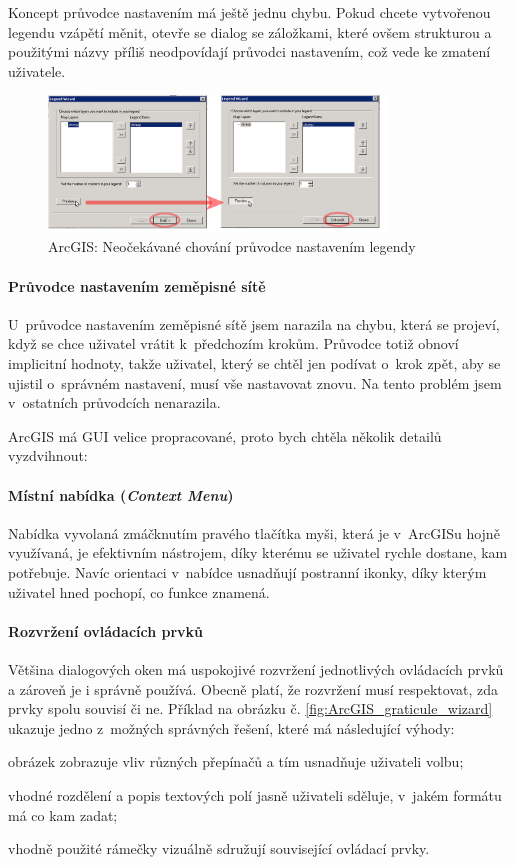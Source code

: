 \documentclass[a4paper,12pt,draft]{article}
\begin{document}
Koncept průvodce nastavením má ještě jednu chybu. Pokud chcete vytvořenou
legendu vzápětí měnit, otevře se dialog se záložkami, které ovšem
strukturou a použitými názvy příliš neodpovídají průvodci nastavením,
což vede ke zmatení uživatele.

\begin{figure}[h!]
\centering
\includegraphics[width=0.8\textwidth]{./GUI_screenshots/ArcGIS_legend_wizard.png}
\caption{ArcGIS: Neočekávané chování průvodce nastavením legendy}
\label{fig:ArcGIS_legend_wizard}
\end{figure}


\paragraph*{Průvodce nastavením zeměpisné sítě}
U~průvodce nastavením zeměpisné sítě jsem narazila na chybu, která se
projeví, když se chce uživatel vrátit k~předchozím krokům. Průvodce
totiž obnoví implicitní hodnoty, takže uživatel, který se chtěl jen
podívat o~krok zpět, aby se ujistil o~správném nastavení, musí vše
nastavovat znovu. Na tento problém jsem v~ostatních průvodcích nenarazila.

\bigskip
ArcGIS má GUI velice propracované, proto
bych chtěla několik detailů vyzdvihnout:
\paragraph*{Místní nabídka (\emph{Context Menu})}
Nabídka vyvolaná zmáčknutím pravého tla\-čítka myši, která je v~ArcGISu
hojně využívaná, je efektivním nástrojem, díky kterému se uživatel
rychle dostane, kam potřebuje. Navíc orientaci v~nabídce usnad\-ňují
postranní ikonky, díky kterým uživatel hned pochopí, co funkce znamená.

\paragraph*{Rozvržení ovládacích prvků}
Většina dialogových oken má uspokojivé rozvržení jednotlivých
ovládacích prvků a zároveň je i správně používá. Obecně platí,
že rozvržení musí respektovat, zda prvky spolu souvisí či ne. Příklad
na obrázku č. \ref{fig:ArcGIS_graticule_wizard} ukazuje jedno z~možných
správných řešení, které má následující výhody:
\begin{inparaenum}[\itshape 1\upshape)]
\item obrázek zobrazuje vliv různých přepínačů a tím usnadňuje
uživateli volbu;
\item vhodné roz\-dělení a popis textových polí jasně uživateli sděluje,
v~jakém formátu má co kam zadat;
\item vhodně použité rámečky vizuálně sdružují související
ovládací prvky.
\end{inparaenum}
\end{document}
